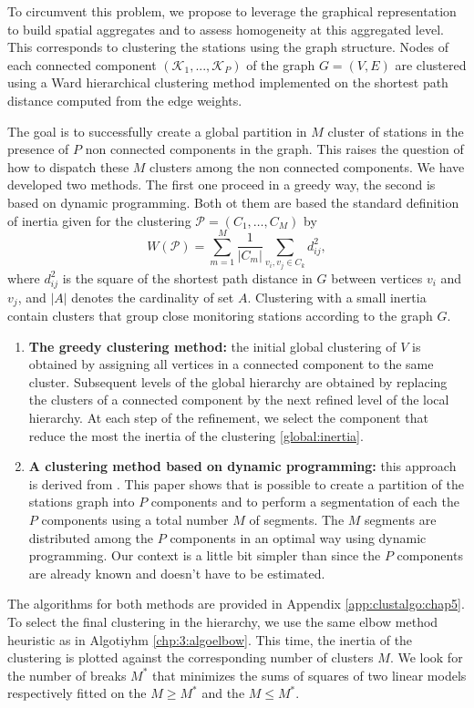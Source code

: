 To circumvent this problem, we propose to leverage the graphical representation to build spatial aggregates and to assess homogeneity at this aggregated level. This corresponds to clustering the stations using the graph structure. Nodes of each connected component $(\mathcal{K}_1,...,\mathcal{K}_P)$ of the graph $G=(V, E)$ are clustered using a Ward hierarchical clustering method implemented on the shortest path distance computed from the edge weights. 

The goal is to successfully create a global partition in $M$ cluster of stations in the presence of $P$ non connected components in the graph. This raises the question of how to dispatch these $M$ clusters among the non connected components. We have developed two methods. The first one proceed in a greedy way, the second is based on dynamic programming. Both ot them are based the standard definition of inertia given for the clustering $\mathcal{P}=(C_1,\ldots, C_M)$ by
\begin{equation}\label{global:inertia}
    W(\mathcal{P}) = \sum_{m=1}^M \frac{1}{|C_m|}\sum_{v_i, v_j \in C_k}d^2_{ij},
\end{equation} 
where $d^2_{ij}$ is the square of the shortest path distance in $G$ between vertices $v_i$ and $v_j$, and $|A|$ denotes the cardinality of set $A$. Clustering with a small inertia contain clusters that group close monitoring stations according to the graph $G$.
\begin{enumerate}
    \item \textbf{The greedy clustering method:} the initial global clustering of $V$ is obtained by assigning all vertices in a connected component to the same cluster. Subsequent levels of the global hierarchy are obtained by replacing the clusters of a connected component by the next refined level of the local hierarchy. At each step of the refinement, we select the component that reduce the most the inertia of the clustering \ref{global:inertia}.
    \item \textbf{A clustering method based on dynamic programming:} this approach is derived from \cite{hebrail2010exploratory}. This paper shows that is possible to create a partition of the stations graph into $P$ components and to perform a segmentation of each the $P$ components using a total number $M$ of segments. The $M$ segments are distributed among the $P$ components in an optimal way using dynamic programming. Our context is a little bit simpler than \cite{hebrail2010exploratory} since the $P$ components are already known and doesn't have to be estimated. 
\end{enumerate}
The algorithms for both methods are provided in Appendix \ref{app:clustalgo:chap5}. To select the final clustering in the hierarchy, we use the same elbow method heuristic as in Algotiyhm \ref{chp:3:algoelbow}. This time, the inertia of the clustering is plotted against the corresponding number of clusters $M$. We look for the number of breaks $M^*$ that minimizes the sums of squares of two linear models respectively fitted on the $M \geq M^*$ and the $M \leq M^*$.      

